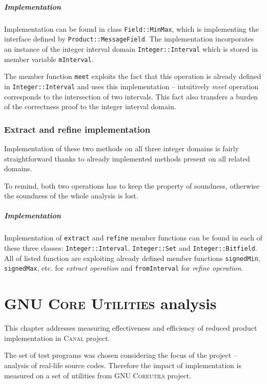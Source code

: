 \documentclass[12pt,oneside]{fithesis2}
\theoremstyle{definition}
\begin{document}
\paragraph{Implementation}
Implementation can be found in class \texttt{Field::MinMax}, which is implementing the interface defined by \texttt{Product::MessageField}. The implementation incorporates an instance of the integer interval domain \texttt{Integer::Interval} which is stored in member variable \texttt{mInterval}.

The member function \texttt{meet} exploits the fact that this operation is already defined in \texttt{Integer::Interval} and uses this implementation -- intuitively \textit{meet} operation corresponds to the intersection of two intervals. This fact also transfers a burden of the correctness proof to the integer interval domain.

\subsection{Extract and refine implementation}

Implementation of these two methods on all three integer domains is fairly straightforward thanks to already implemented methods present on all related domains.

To remind, both two operations has to keep the property of soundness, otherwise the soundness of the whole analysis is lost.

\paragraph{Implementation}
Implementation of \texttt{extract} and \texttt{refine} member functions can be found in each of these three classes: \texttt{Integer::Interval}, \texttt{Integer::Set} and \texttt{Integer::Bitfield}. All of listed function are exploiting already defined member functions \texttt{signedMin}, \texttt{signedMax}, etc. for \textit{extract operation} and \texttt{fromInterval} for \textit{refine operation}.

\chapter{\textsc{GNU Core Utilities} analysis}\label{ch:measurements}

This chapter addresses measuring effectiveness and efficiency of reduced product implementation in \textsc{Canal} project.

The set of test programs was chosen considering the focus of the project -- analysis of real-life source codes. Therefore the impact of implementation is measured on a set of utilities from \textsc{GNU Coreutils} project.
\end{document}
